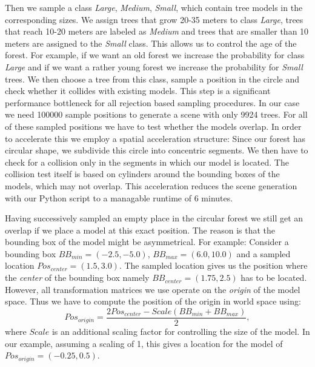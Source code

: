 Then we sample a class \textit{Large}, \textit{Medium}, \textit{Small}, which contain tree models in the corresponding sizes.
We assign trees that grow 20-35 meters to class \textit{Large}, trees that reach 10-20 meters are labeled as \textit{Medium} and trees that are smaller than 10 meters are assigned to the \textit{Small} class.
This allows us to control the age of the forest.
For example, if we want an old forest we increase the probability for class \textit{Large} and if we want a rather young forest we increase the probability for \textit{Small} trees.
We then choose a tree from this class, sample a position in the circle and check whether it collides with existing models.
This step is a significant performance bottleneck for all rejection based sampling procedures.
In our case we need 100000 sample positions to generate a scene with only 9924 trees.
For all of these sampled positions we have to test whether the models overlap.
In order to accelerate this we employ a spatial acceleration structure: Since our forest has circular shape, we subdivide this circle into concentric segments.
We then have to check for a collision only in the segments in which our model is located.
The collision test itself is based on cylinders around the bounding boxes of the models, which may not overlap.
This acceleration reduces the scene generation with our Python script to a managable runtime of 6 minutes.

Having successively sampled an empty place in the circular forest we still get an overlap if we place a model at this exact position.
The reason is that the bounding box of the model might be asymmetrical.
For example: Consider a bounding box $BB_{min}=(-2.5, -5.0)$, $BB_{max}=(6.0, 10.0)$ and a sampled location $Pos_{center}=(1.5, 3.0)$.
The sampled location gives us the position where the \textit{center} of the bounding box namely $BB_{center}=(1.75, 2.5)$ has to be located.
However, all transformation matrices we use operate on the \textit{origin} of the model space.
Thus we have to compute the position of the origin in world space using:
\begin{equation*}
    Pos_{origin}=\frac{2Pos_{center}-Scale(BB_{min}+BB_{max})}{2},
\end{equation*}
where $Scale$ is an additional scaling factor for controlling the size of the model.
In our example, assuming a scaling of 1, this gives a location for the model of $Pos_{origin}=(-0.25, 0.5)$.

